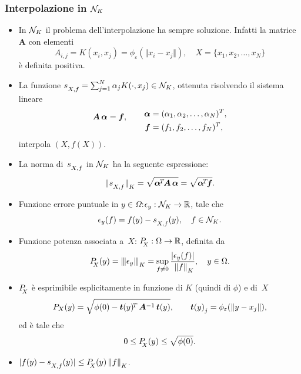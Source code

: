 \documentclass[10pt]{beamer}
\theoremstyle{definition}
\theoremstyle{plain}
\def\R{\mathbb R}
\def\Cal#1{{\cal #1}}
\def\norm#1{\Vert #1\Vert}
\def\opnorm#1{|\mskip-1.5mu|\mskip-1.5mu|#1|\mskip-1.5mu|\mskip-1.5mu|}
\def\hbyw#1#2{\vbox to #1{\vfil \hbox to #2{\hfil}}}
\def\hbywtop#1#2{\vtop to #1{\vfil \hbox to #2{\hfil}}}
\def\lK{{\lower.5ex\hbox{$\scriptstyle K$}}}
\def\lX{{\!\!\lower.5ex\hbox{$\scriptstyle X$}}}
\def\lXf{{\lower.5ex\hbox{$\scriptstyle X, f$}}}
\begin{document}
\begin{frame}
\frametitle{Interpolazione in $\Cal N_K$}
\begin{itemize}
\item 
In $\Cal N_K$ il problema dell’interpolazione ha sempre soluzione.  Infatti la matrice $\bm A$ con elementi
$$
A_{i,j} = K(x_i, x_j) = \phi_\varepsilon( \norm{x_i-x_j}), \quad  X=\{x_1,x_2,\dots,x_N\}
$$
è definita positiva.

\item
La funzione $s_\lXf = \sum_{j=1}^N \alpha_j K(\cdot, x_j)\in\Cal N_K$, ottenuta risolvendo il sistema lineare
 $$
 \bm A\,\bm\alpha = \bm f, \qquad  \lower1ex\hbox{$\begin{aligned} 
 								\bm\alpha &= (\alpha_1,\alpha_2,\dots,\alpha_N)^T, \\
								\bm f &= (f_1,f_2,\dots,f_N)^T,
								\end{aligned}$}
$$
interpola $(X, f(X))$.
\item
La norma di~$s_\lXf$ in $\Cal N_K$ ha la seguente espressione:
$$
\norm{s_\lXf}_\lK= \sqrt{\hbywtop{.2ex}{0em}\hbyw{1.8ex}{0em}\bm\alpha^{\!T\!}\bm A\,\bm\alpha} = \sqrt{\hbywtop{.2ex}{0em}\hbyw{1.8ex}{0em}\bm\alpha^{\!T\!}\bm f}.
$$
\end{itemize}
\end{frame}


\begin{frame}
\begin{itemize}
\item
Funzione \alert{errore puntuale} in $y\in\Omega$:\quad $\epsilon_y:\Cal N_K\to\R$, tale che 
$$
\epsilon_y(f) = f(y)-s_\lXf(y),\quad f\in\Cal N_K.
$$

\item
Funzione \alert{potenza} associata a~$X$: \quad $P_{\lX}:\Omega\to\R$, definita da
$$
P_\lX(y) = \opnorm{\epsilon_y}_\lK = \sup_{f\neq 0} \frac{|\epsilon_y(f)|}{\,\,\norm f_\lK}, \quad y\in\Omega.
$$

\item 
$P_\lX$ è esprimibile esplicitamente in funzione di $K$ (quindi di $\phi$) e di~$X$
$$
P_X(y) = \sqrt{\phi(0)-\bm t(y)^{\!T\,}\bm A^{-1}\, \bm t(y)},\qquad \bm t(y)_{\lower.4ex\hbox{$\scriptstyle j$}} = \phi_\varepsilon(\norm{y-x_j}),
$$
ed è tale che
$$
0\leq P_\lX(y)\leq\sqrt{\phi(0)}.
$$

\medskip

\item $|f(y)-s_\lXf(y)| \leq P_\lX(y)\, \norm f_\lK$.

\end{itemize}


\end{frame}
\end{document}
